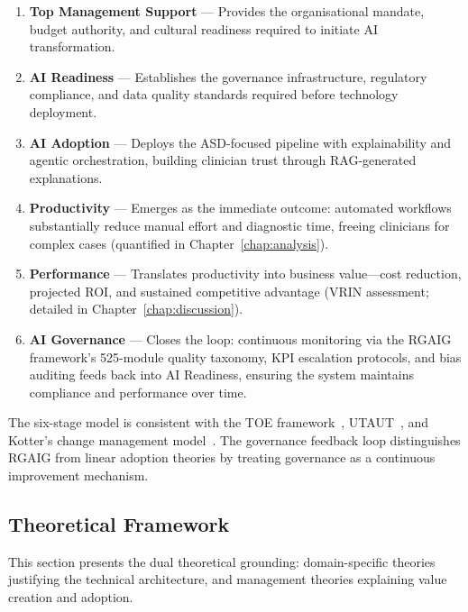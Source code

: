 \begin{enumerate}[leftmargin=*, itemsep=3pt]
    \item \textbf{Top Management Support} --- Provides the organisational mandate, budget authority, and cultural readiness required to initiate AI transformation.
    \item \textbf{AI Readiness} --- Establishes the governance infrastructure, regulatory compliance, and data quality standards required before technology deployment.
    \item \textbf{AI Adoption} --- Deploys the ASD-focused pipeline with explainability and agentic orchestration, building clinician trust through RAG-generated explanations.
    \item \textbf{Productivity} --- Emerges as the immediate outcome: automated workflows substantially reduce manual effort and diagnostic time, freeing clinicians for complex cases (quantified in Chapter~\ref{chap:analysis}).
    \item \textbf{Performance} --- Translates productivity into business value---cost reduction, projected ROI, and sustained competitive advantage (VRIN assessment; detailed in Chapter~\ref{chap:discussion}).
    \item \textbf{AI Governance} --- Closes the loop: continuous monitoring via the RGAIG framework's 525-module quality taxonomy, KPI escalation protocols, and bias auditing feeds back into AI Readiness, ensuring the system maintains compliance and performance over time.
\end{enumerate}
\fi


\noindent The six-stage model is consistent with the TOE framework~\cite{tornatzky1990processes}, UTAUT~\cite{venkatesh2003utaut}, and Kotter's change management model~\cite{kotter1996leading}. The governance feedback loop distinguishes RGAIG from linear adoption theories by treating governance as a continuous improvement mechanism.

\subsection{Theoretical Framework}
\label{sec:theoretical_framework}

This section presents the dual theoretical grounding: domain-specific theories justifying the technical architecture, and management theories explaining value creation and adoption.

\iffalse %
